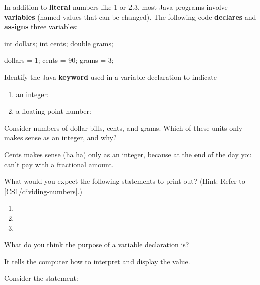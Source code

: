 
\label{CS1/variable-declare}

In addition to \textbf{literal} numbers like 1 or 2.3, most Java programs involve \textbf{variables} (named values that can be changed).
The following code \textbf{declares} and \textbf{assigns} three variables:

\begin{javabox}
int dollars;
int cents;
double grams;

dollars = 1;
cents = 90;
grams = 3;
\end{javabox}




\Q Identify the Java \textbf{keyword} used in a variable declaration to indicate

\begin{enumerate}
\item an integer: 
\item a floating-point number: 
\end{enumerate}


\Q Consider numbers of dollar bills, cents, and grams. Which of these units only makes sense as an integer, and why?

\begin{answer}
Cents makes sense (ha ha) only as an integer, because at the end of the day you can't pay with a fractional amount.
\end{answer}


\Q What would you expect the following statements to print out? (Hint: Refer to \ref{CS1/dividing-numbers}.)

\begin{enumerate}
\item {} 
\item {} 
\item {} 
\end{enumerate}


\Q What do you think the purpose of a variable declaration is?

\begin{answer}
It tells the computer how to interpret and display the value.
\end{answer}


\newpage
\Q Consider the statement: ~ 

